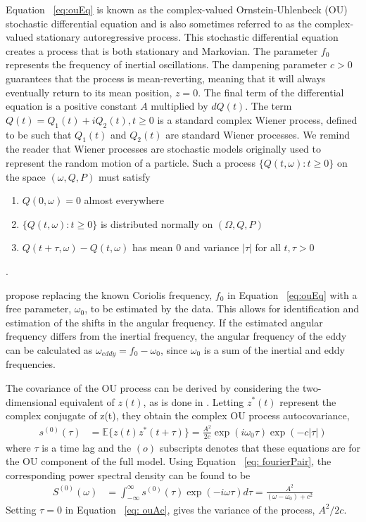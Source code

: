 \documentclass{stat572Style}
\begin{document}
Equation ~\ref{eq:ouEq}  is known as the complex-valued Ornstein-Uhlenbeck (OU) stochastic differential equation and is also sometimes referred to as the complex-valued stationary autoregressive process. 
This stochastic differential equation creates a process  that is both stationary and Markovian. 
The parameter $f_{0}$ represents the frequency of inertial oscillations. The dampening parameter $c > 0$  guarantees that the process is mean-reverting, meaning that it will always eventually return to its mean position, $z = 0$.  
 The final term of the differential equation is a positive constant $A$ multiplied by $dQ(t)$.  The term $Q(t) = Q_{1}(t) + i Q_{2}(t), t \geq 0$ is a standard complex Wiener process, defined to be such that $Q_{1}(t)$ and $Q_{2}(t)$ are standard Wiener processes.
  We remind the reader that Wiener processes are stochastic models originally used to represent the random motion of a particle. 
  Such a process $\{Q(t, \omega): t \geq 0\}$ on the space $(\omega, Q, P)$ must satisfy
\begin{enumerate}
\item $Q(0, \omega) = 0$ almost everywhere
\item $\{Q(t, \omega): t \geq 0\}$ is distributed normally on $(\Omega,Q, P)$
\item $Q(t + \tau, \omega) - Q(t, \omega)$ has mean 0 and variance $|\tau|$ for all $t, \tau > 0$
\end{enumerate}
\citep{Hida1980}. 

\citet{Sykulski2016} propose replacing the known Coriolis frequency, $f_{0}$  in Equation ~\ref{eq:ouEq} with  a free parameter, $\omega_{0}$, to be estimated by the data. 
This allows for identification and estimation of the shifts in the angular frequency. 
If the estimated angular frequency differs from the inertial frequency, the angular frequency of the eddy can be calculated as $\omega_{eddy} = f_{0} - \omega_{0}$, since $\omega_{0}$ is a sum of the inertial and eddy frequencies.


The covariance of the OU process can be derived by considering the two-dimensional equivalent of $z(t)$, as is done in  \citet{Arato1999}. 
Letting $z^{*}(t)$ represent the complex conjugate of z(t), they obtain the complex OU process autocovariance,
\begin{align}
\label{eq:ouAC}
s^{(0)}(\tau) &= \mathbb{E}\{z(t)z^{*}(t + \tau) \} = \frac{A^{2}}{2c} \exp(i \omega_{0}\tau) \exp(-c|\tau|)
\end{align}
where $\tau$ is a time lag and the $(o)$ subscripts denotes that these equations are for the OU component of the full model. 
 Using Equation ~\ref{eq: fourierPair}, the corresponding power spectral density can be found to be\begin{align}
\label{eq:ouPSD}
S^{(0)}(\omega) &= \int_{-\infty}^{\infty} s^{(0)}(\tau) \exp (-i \omega \tau) d \tau = \frac{A^{2}}{(\omega - \omega_{0}) + c^{2}}
\end{align}
\noindent Setting $\tau = 0$ in Equation ~\ref{eq: ouAc}, gives the variance of the process, $A^{2}/2c$.
\end{document}
